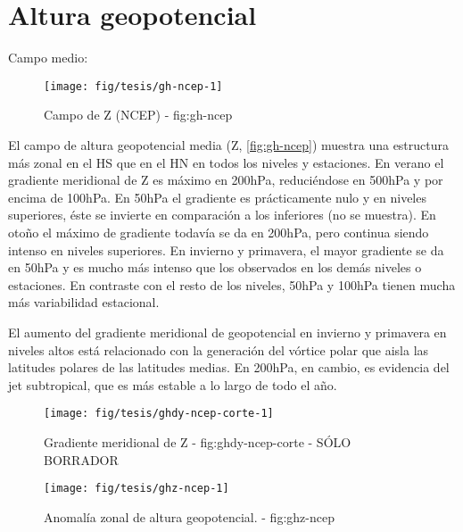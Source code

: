 \documentclass[spanish,a4paper]{book}
\begin{document}
\section{Altura geopotencial}\label{altura-geopotencial}

Campo medio:

\begin{landscape}\begin{figure}

{\centering \texttt{[image: fig/tesis/gh-ncep-1]} 

}

\caption{Campo de Z (NCEP) - fig:gh-ncep}\label{fig:gh-ncep}
\end{figure}
\end{landscape}

El campo de altura geopotencial media (Z, \autoref{fig:gh-ncep}) muestra
una estructura más zonal en el HS que en el HN en todos los niveles y
estaciones. En verano el gradiente meridional de Z es máximo en 200hPa,
reduciéndose en 500hPa y por encima de 100hPa. En 50hPa el gradiente es
prácticamente nulo y en niveles superiores, éste se invierte en
comparación a los inferiores (no se muestra). En otoño el máximo de
gradiente todavía se da en 200hPa, pero continua siendo intenso en
niveles superiores. En invierno y primavera, el mayor gradiente se da en
50hPa y es mucho más intenso que los observados en los demás niveles o
estaciones. En contraste con el resto de los niveles, 50hPa y 100hPa
tienen mucha más variabilidad estacional.

El aumento del gradiente meridional de geopotencial en invierno y
primavera en niveles altos está relacionado con la generación del
vórtice polar que aisla las latitudes polares de las latitudes medias.
En 200hPa, en cambio, es evidencia del jet subtropical, que es más
estable a lo largo de todo el año.

\begin{figure*}
\texttt{[image: fig/tesis/ghdy-ncep-corte-1]} \caption{Gradiente meridional de Z - fig:ghdy-ncep-corte - SÓLO BORRADOR}\label{fig:ghdy-ncep-corte}
\end{figure*}

\begin{landscape}\begin{figure}

{\centering \texttt{[image: fig/tesis/ghz-ncep-1]} 

}

\caption{Anomalía zonal de altura geopotencial. - fig:ghz-ncep}\label{fig:ghz-ncep}
\end{figure}
\end{landscape}
\end{document}
